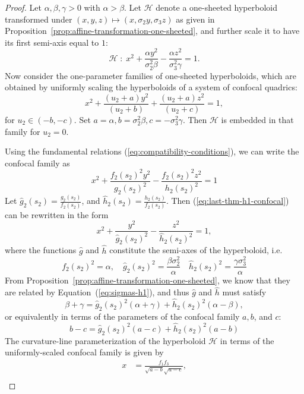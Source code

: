 \documentclass[10pt, a4paper]{article}
\theoremstyle{BoldTopSpacing}
\theoremstyle{BoldTopSpacing}
\theoremstyle{BoldTopSpacing}
\theoremstyle{BoldTopBottomSpacing}
\theoremstyle{BoldTopSpacing}
\theoremstyle{BoldTopBottomSpacing}
\theoremstyle{remark}
\begin{document}
\begin{proof}
    Let $\alpha, \beta, \gamma > 0$ with $\alpha > \beta$. Let $\mathcal{H}$ denote a one-sheeted hyperboloid transformed under ${(x, y, z) \mapsto (x, \sigma_2 y, \sigma_3 z)}$ as given in Proposition~\ref{prop:affine-transformation-one-sheeted}, and further scale it to have its first semi-axis equal to $1$:
\[
\mathcal{H} \; : \; x^2 + \frac{\alpha y^2}{\sigma_{2}^2 \beta} - \frac{\alpha z^2}{\sigma_{3}^2 \gamma} = 1.
\]
Now consider the one-parameter families of one-sheeted hyperboloids, which are obtained by uniformly scaling the hyperboloids of a system of confocal quadrics:
\[
x^2 + \frac{(u_{2} + a)y^2}{(u_{2} + b)} + \frac{(u_{2} + a)z^2}{(u_{2} + c)} = 1,
\]
for $u_{2} \in (-b, -c)$. Set $a = \alpha, b = \sigma_{2}^2 \beta, c = -\sigma_{3}^2 \gamma$. Then $\mathcal{H}$ is embedded in that family for $u_{2} = 0$. \par
Using the fundamental relations (\ref{eq:compatibility-conditions}), we can write the confocal family as
\begin{equation}
\label{eq:last-thm-h1-confocal}
x^2 + \frac{f_{2}(s_{2})^2 y^2}{g_{2}(s_{2})^2} - \frac{f_{2}(s_{2})^2 z^2}{h_{2}(s_{2})^2} = 1
\end{equation}
Let $\hat{g}_{2}(s_{2}) = \frac{g_{2}(s_{2})}{f_{2}(s_{2})}$, and $\hat{h}_{2}(s_{2}) = \frac{h_{2}(s_{2})}{f_{2}(s_{2})}$. Then (\ref{eq:last-thm-h1-confocal}) can be rewritten in the form
\[
x^2 + \frac{y^2}{\hat{g}_{2}(s_{2})^2} -  \frac{z^2}{\hat{h}_{2}(s_{2})^2} = 1,
\]
where the functions $\hat{g}$ and $\hat{h}$ constitute the semi-axes of the hyperboloid, i.e.
\[
f_{2}(s_{2})^2 = \alpha, \quad \hat{g}_{2}(s_{2})^2 = \frac{\beta \sigma_{2}^2}{\alpha} \quad \hat{h}_{2}(s_{2})^2 = \frac{\gamma \sigma_{3} ^2}{\alpha}
\]
From Proposition~\ref{prop:affine-transformation-one-sheeted}, we know that they are related by Equation~(\ref{eq:sigmas-h1}), and thus $\hat{g}$ and $\hat{h}$ must satisfy
\[
\beta + \gamma = \hat{g}_{2}(s_{2})^2(\alpha + \gamma) + \hat{h}_{2}(s_{2})^2(\alpha - \beta),
\]
or equivalently in terms of the parameters of the confocal family $a, b$, and $c$:
\[
    b - c = \hat{g}_{2}(s_{2})^2(a - c) + \hat{h}_{2}(s_{2})^2(a - b)
\]
The curvature-line parameterization of the hyperboloid $\mathcal{H}$ in terms of the uniformly-scaled confocal family is given by
\begin{equation}
\begin{aligned}
\label{eq:confocal-h1-parameterization}
    x &= \frac{f_1 f_3}{\sqrt{a-b}\sqrt{a-c}}, \\

\end{aligned}
\end{equation}
\end{proof}
\end{document}
